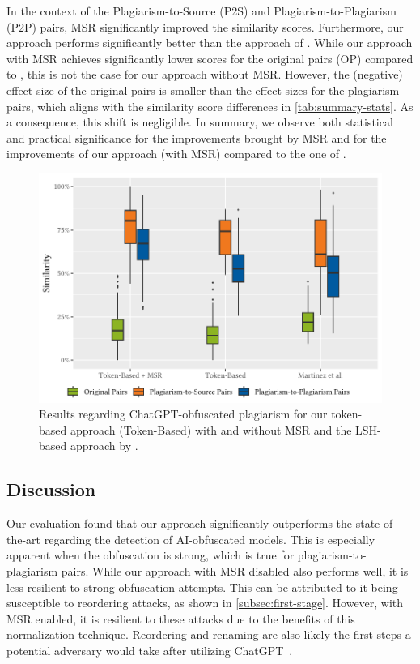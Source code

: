 In the context of the Plagiarism-to-Source (P2S) and Plagiarism-to-Plagiarism (P2P) pairs, MSR significantly improved the similarity scores.
Furthermore, our approach performs significantly better than the approach of \citet{Martinez2020}.
While our approach with MSR achieves significantly lower scores for the original pairs (OP) compared to \citet{Martinez2020}, this is not the case for our approach without MSR.
However, the (negative) effect size of the original pairs is smaller than the effect sizes for the plagiarism pairs, which aligns with the similarity score differences in \autoref{tab:summary-stats}. As a consequence, this shift is negligible.
In summary, we observe both statistical and practical significance for the improvements brought by MSR and for the improvements of our approach (with MSR) compared to the one of \citet{Martinez2020}.

\begin{figure}
    \centering
    \includegraphics[width=\linewidth]{figures/disseval2/chatgpt_avg.similarity.pdf}
    \caption[Evaluation: AI-based Obfuscation of Models]{Results regarding ChatGPT-obfuscated plagiarism for our token-based approach (Token-Based) with and without MSR and the LSH-based approach by \citet{Martinez2020}.}
    \label{fig:ai-obfuscated-models}
\end{figure}

 \subsection{Discussion}
Our evaluation found that our approach significantly outperforms the state-of-the-art regarding the detection of AI-obfuscated models.
This is especially apparent when the obfuscation is strong, which is true for plagiarism-to-plagiarism pairs.
While our approach with MSR disabled also performs well, it is less resilient to strong obfuscation attempts.
This can be attributed to it being susceptible to reordering attacks, as shown in \autoref{subsec:first-stage}.
However, with MSR enabled, it is resilient to these attacks due to the benefits of this normalization technique.
Reordering and renaming are also likely the first steps a potential adversary would take after utilizing ChatGPT~\cite{Saglam2023}. 


